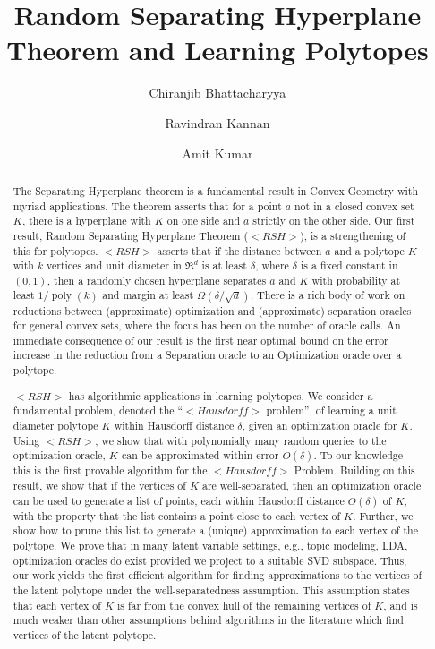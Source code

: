 \documentclass[11pt,letterpaper]{article}
\newcounter{note}[section]
\def\mathsf#1{<#1>}%
\def\xspace{}%
\theoremstyle{definition}
\theoremstyle{remark}
\newcommand{\poly}{\operatorname{poly}}
\newcommand{\rsh}{{\mathsf {RSH}}\xspace}
\newcommand{\Hausdorf}{\mathsf {Hausdorff}\xspace }
\begin{document}
\title{Random Separating Hyperplane Theorem and Learning Polytopes}
\author{Chiranjib Bhattacharyya \and Ravindran Kannan \and Amit Kumar}
\maketitle
\begin{abstract}
The Separating Hyperplane theorem  is a fundamental result in Convex Geometry with myriad applications. The theorem asserts that for a point $a$ not in a closed convex set $K$, there is a hyperplane with $K$ on one side and $a$ strictly on the other side. Our first result, Random Separating Hyperplane  Theorem ($\rsh$), is a strengthening of this for polytopes. $\rsh$ asserts that if the distance between $a$ and a polytope $K$ with $k$ vertices and unit diameter in $\Re^d$ is at least $\delta$, where $\delta$ is a fixed constant in $(0,1)$, then a randomly chosen hyperplane separates $a$ and $K$ with probability at least $1/\poly(k)$ and  margin at least $\Omega \left( \delta/\sqrt{d} \right)$.
There is  a rich body of work on reductions between (approximate) optimization and (approximate) separation oracles for general convex sets, where the focus has been on the number of oracle calls. 
An immediate consequence of our result is the first near optimal bound on the error increase in the reduction from a Separation oracle to an Optimization oracle over a polytope.

$\rsh$  has algorithmic applications in learning polytopes. We consider a fundamental problem, denoted the ``$\Hausdorf$ problem'', of learning a unit diameter polytope $K$ within Hausdorff distance $\delta$,  given an optimization oracle for $K$.
Using $\rsh$, we show that with polynomially many random queries to the optimization oracle, $K$ can be approximated within error  $O(\delta)$. 
To our knowledge this is the first provable algorithm for the $\Hausdorf$ Problem.  Building on this result, we show that if the vertices of $K$ are well-separated, then an optimization oracle can be used to generate a list of points, each within Hausdorff distance $O(\delta)$  of $K$, with the property that the list contains a point close to each vertex of $K$. %
Further, we show how to prune this list to generate a (unique) approximation to each vertex of the polytope. We prove that in many latent variable settings, e.g., topic modeling, LDA,  optimization oracles do exist provided we project to a suitable SVD subspace. Thus, our work  yields the first efficient algorithm for finding approximations  to the vertices of the latent polytope under the well-separatedness assumption. This assumption states that each vertex of  $K$ is far from the convex hull of the remaining vertices of $K$, and is much weaker than other assumptions behind algorithms in the literature which find vertices of the latent polytope. 
\end{abstract}
\thispagestyle{empty}
\newpage
\setcounter{page}{1}
\end{document}
